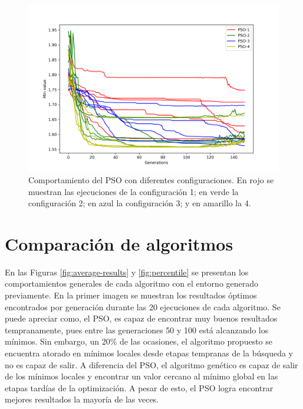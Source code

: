 \documentclass[letterpaper]{report}
\begin{document}
    \begin{figure}[ht!]
      \centering
      \includegraphics[width=\textwidth]{params-search-lines.png}
      \caption{
        Comportamiento del PSO con diferentes configuraciones. En rojo se
        muestran las ejecuciones de la configuración 1; en verde la
        configuración 2; en azul la configuración 3; y en amarillo la 4.
      }
      \label{fig:params-search-lines}
    \end{figure}

  \section{Comparación de algoritmos}

    En las Figuras \ref{fig:average-results} y \ref{fig:percentile} se presentan
    los comportamientos generales de cada algoritmo con el entorno generado
    previamente. En la primer imagen se muestran los resultados óptimos
    encontrados por generación durante las 20 ejecuciones de cada algoritmo. Se
    puede apreciar como, el PSO, es capaz de encontrar muy buenos resultados
    tempranamente, pues entre las generaciones 50 y 100 está alcanzando los
    mínimos. Sin embargo, un 20\% de las ocasiones, el algoritmo propuesto se
    encuentra atorado en mínimos locales desde etapas tempranas de la búsqueda y
    no es capaz de salir. A diferencia del PSO, el algoritmo genético es capaz
    de salir de los mínimos locales y encontrar un valor cercano al mínimo
    global en las etapas tardías de la optimización. A pesar de esto, el PSO
    logra encontrar mejores resultados la mayoría de las veces.
\end{document}
